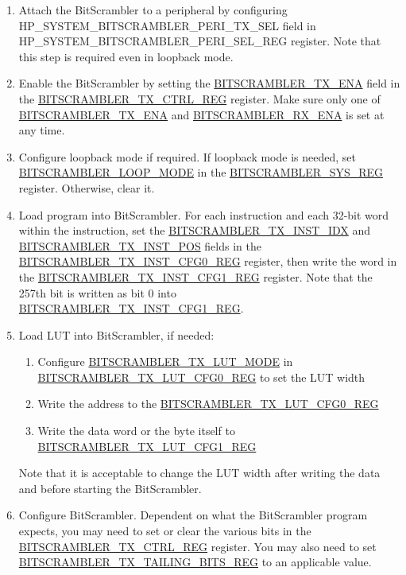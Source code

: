 \documentclass[main\_\_EN.tex]{subfiles}
\begin{document}
\begin{enumerate}
    \item Attach the BitScrambler to a peripheral by configuring HP\_SYSTEM\_BITSCRAMBLER\_PERI\_TX\_SEL field in HP\_SYSTEM\_BITSCRAMBLER\_PERI\_SEL\_REG register. Note that this step is required even in loopback mode.
    \item Enable the BitScrambler by setting the \hyperref[fielddesc:BITSCRAMBLERTXENA]{BITSCRAMBLER\_TX\_ENA} field in the \hyperref[regdesc:BITSCRAMBLERTXCTRLREG]{BITSCRAMBLER\_TX\_CTRL\_REG} register. Make sure only one of \hyperref[fielddesc:BITSCRAMBLERTXENA]{BITSCRAMBLER\_TX\_ENA} and \hyperref[fielddesc:BITSCRAMBLERRXENA]{BITSCRAMBLER\_RX\_ENA} is set at any time.
    \item Configure loopback mode if required. If loopback mode is needed, set \hyperref[fielddesc:BITSCRAMBLERLOOPMODE]{BITSCRAMBLER\_LOOP\_MODE} in the \hyperref[regdesc:BITSCRAMBLERSYSREG]{BITSCRAMBLER\_SYS\_REG} register. Otherwise, clear it.
    \item Load program into BitScrambler. For each instruction and each 32-bit word within the instruction, set the \hyperref[fielddesc:BITSCRAMBLERTXINSTIDX]{BITSCRAMBLER\_TX\_INST\_IDX} and \hyperref[fielddesc:BITSCRAMBLERTXINSTPOS]{BITSCRAMBLER\_TX\_INST\_POS} fields in the \hyperref[regdesc:BITSCRAMBLERTXINSTCFG0REG]{BITSCRAMBLER\_TX\_INST\_CFG0\_REG} register, then write the word in the \hyperref[regdesc:BITSCRAMBLERTXINSTCFG1REG]{BITSCRAMBLER\_TX\_INST\_CFG1\_REG} register. Note that the 257th bit is written as bit 0 into \hyperref[regdesc:BITSCRAMBLERTXINSTCFG1REG]{BITSCRAMBLER\_TX\_INST\_CFG1\_REG}.
    \item Load LUT into BitScrambler, if needed:
    \begin{enumerate}
        \item Configure \hyperref[fielddesc:BITSCRAMBLERTXLUTMODE]{BITSCRAMBLER\_TX\_LUT\_MODE} in \hyperref[regdesc:BITSCRAMBLERTXLUTCFG0REG]{BITSCRAMBLER\_TX\_LUT\_CFG0\_REG} to set the LUT width
        \item Write the address to the \hyperref[regdesc:BITSCRAMBLERTXLUTCFG0REG]{BITSCRAMBLER\_TX\_LUT\_CFG0\_REG}
        \item Write the data word or the byte itself to \hyperref[regdesc:BITSCRAMBLERTXLUTCFG1REG]{BITSCRAMBLER\_TX\_LUT\_CFG1\_REG}
    \end{enumerate}
        Note that it is acceptable to change the LUT width after writing the data and before starting the BitScrambler.
    \item Configure BitScrambler. Dependent on what the BitScrambler program expects, you may need to set or clear the various bits in the \hyperref[regdesc:BITSCRAMBLERTXCTRLREG]{BITSCRAMBLER\_TX\_CTRL\_REG} register. You may also need to set \hyperref[regdesc:BITSCRAMBLERTXTAILINGBITSREG]{BITSCRAMBLER\_TX\_TAILING\_BITS\_REG} to an applicable value.

\end{enumerate}
\end{document}
